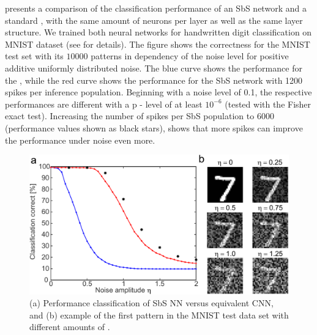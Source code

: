  presents a comparison of the classification performance of an SbS network and a standard , with the same amount of
neurons per layer as well as the same layer structure. We trained both neural networks for handwritten digit classification on MNIST dataset\cite{lecun1998mnist} (see \cite{rotermund2019Backpropagation} for details). The figure shows the correctness for the MNIST test set with its $10000$ patterns in dependency of the noise level for positive additive
uniformly distributed noise. The blue curve shows the performance for
the , while the red curve shows the performance for
the SbS network with 1200 spikes per inference population. Beginning
with a noise level of 0.1, the respective performances are different
with a p - level of at least $10^{-6}$ (tested with the Fisher exact
test). Increasing the number of spikes per SbS population to 6000
(performance values shown as black stars), shows that more spikes can
improve the performance under noise even more.

\begin{figure}[t!]
	\includegraphics[width=\columnwidth]{../figures/sbs_robustnes.pdf}
	\caption{(a) Performance classification of SbS NN versus equivalent CNN, and (b) example of the first pattern in the MNIST test data set with different amounts of .}
	\label{fig:robustnes_sbs}
\end{figure}

